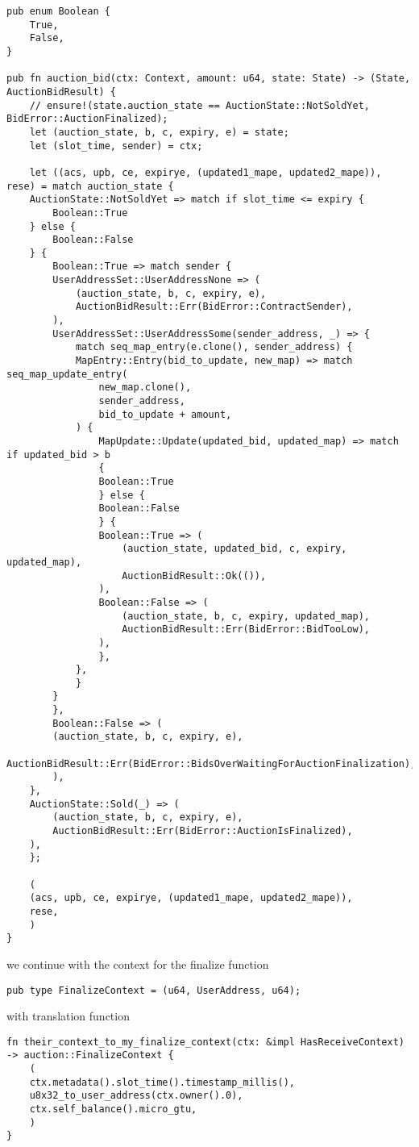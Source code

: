 \documentclass[11pt]{article}
\begin{document}
\begin{verbatim}
pub enum Boolean {
    True,
    False,
}

pub fn auction_bid(ctx: Context, amount: u64, state: State) -> (State, AuctionBidResult) {
    // ensure!(state.auction_state == AuctionState::NotSoldYet, BidError::AuctionFinalized);
    let (auction_state, b, c, expiry, e) = state;
    let (slot_time, sender) = ctx;

    let ((acs, upb, ce, expirye, (updated1_mape, updated2_mape)), rese) = match auction_state {
	AuctionState::NotSoldYet => match if slot_time <= expiry {
	    Boolean::True
	} else {
	    Boolean::False
	} {
	    Boolean::True => match sender {
		UserAddressSet::UserAddressNone => (
		    (auction_state, b, c, expiry, e),
		    AuctionBidResult::Err(BidError::ContractSender),
		),
		UserAddressSet::UserAddressSome(sender_address, _) => {
		    match seq_map_entry(e.clone(), sender_address) {
			MapEntry::Entry(bid_to_update, new_map) => match seq_map_update_entry(
			    new_map.clone(),
			    sender_address,
			    bid_to_update + amount,
			) {
			    MapUpdate::Update(updated_bid, updated_map) => match if updated_bid > b
			    {
				Boolean::True
			    } else {
				Boolean::False
			    } {
				Boolean::True => (
				    (auction_state, updated_bid, c, expiry, updated_map),
				    AuctionBidResult::Ok(()),
				),
				Boolean::False => (
				    (auction_state, b, c, expiry, updated_map),
				    AuctionBidResult::Err(BidError::BidTooLow),
				),
			    },
			},
		    }
		}
	    },
	    Boolean::False => (
		(auction_state, b, c, expiry, e),
		AuctionBidResult::Err(BidError::BidsOverWaitingForAuctionFinalization),
	    ),
	},
	AuctionState::Sold(_) => (
	    (auction_state, b, c, expiry, e),
	    AuctionBidResult::Err(BidError::AuctionIsFinalized),
	),
    };

    (
	(acs, upb, ce, expirye, (updated1_mape, updated2_mape)),
	rese,
    )
}
\end{verbatim}
we continue with the context for the finalize function
\begin{verbatim}
pub type FinalizeContext = (u64, UserAddress, u64);
\end{verbatim}
with translation function
\begin{verbatim}
fn their_context_to_my_finalize_context(ctx: &impl HasReceiveContext) -> auction::FinalizeContext {
    (
	ctx.metadata().slot_time().timestamp_millis(),
	u8x32_to_user_address(ctx.owner().0),
	ctx.self_balance().micro_gtu,
    )
}
\end{verbatim}
\end{document}
